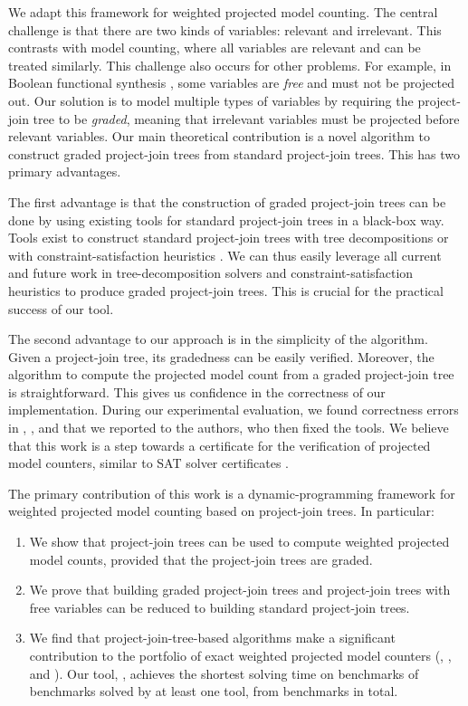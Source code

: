We adapt this framework for weighted projected model counting. The central challenge is that there are two kinds of variables: relevant and irrelevant. This contrasts with model counting, where all variables are relevant and can be treated similarly. This challenge also occurs for other problems.
For example, in Boolean functional synthesis \cite{tabajara2017factored}, some variables are \emph{free} and must not be projected out. 
Our solution is to model multiple types of variables by requiring the project-join tree to be \emph{graded}, meaning that irrelevant variables must be projected before relevant variables. Our main theoretical contribution is a novel algorithm to construct graded project-join trees from standard project-join trees. This has two primary advantages. 

The first advantage is that the construction of graded project-join trees can be done by using existing tools for standard project-join trees \cite{dudek2020dpmc} in a black-box way. Tools exist to construct standard project-join trees with tree decompositions \cite{RS91} or with constraint-satisfaction heuristics \cite{tarjan1984simple,koster2001treewidth,dechter03,dechter99,bouquet1999gestion}.
We can thus easily leverage all current and future work in tree-decomposition solvers \cite{strasser2017computing,AMW17,Tamaki17} and constraint-satisfaction heuristics to produce graded project-join trees. This is crucial for the practical success of our tool.

The second advantage to our approach is in the simplicity of the algorithm. Given a project-join tree, its gradedness can be easily verified. 
Moreover, the algorithm to compute the projected model count from a graded project-join tree is straightforward. This gives us confidence in the correctness of our implementation. 
During our experimental evaluation, we found correctness errors in \dfp{} \cite{lagniez2019recursive}, \projmc{} \cite{lagniez2019recursive}, and \ssat{} \cite{lee2017solving} that we reported to the authors, who then fixed the tools. 
We believe that this work is a step towards a certificate for the verification of projected model counters, similar to SAT solver certificates \cite{wetzler2014drat}.

The primary contribution of this work is a dynamic-programming framework for weighted projected model counting based on project-join trees. In particular:
\begin{enumerate}
    \item We show that project-join trees can be used to compute weighted projected model counts, provided that the project-join trees are graded.
    \item We prove that building graded project-join trees and project-join trees with free variables can be reduced to building standard project-join trees.
    \item We find that project-join-tree-based algorithms make a significant contribution to the portfolio of exact weighted projected model counters (\dfp{}, \projmc{}, and \ssat{}).
    Our tool, \procount{}, achieves the shortest solving time on \dpmcFastestBenchmarks{} benchmarks of \solvedBenchmarks{} benchmarks solved by at least one tool, from \benchmarks{} benchmarks in total.
\end{enumerate}